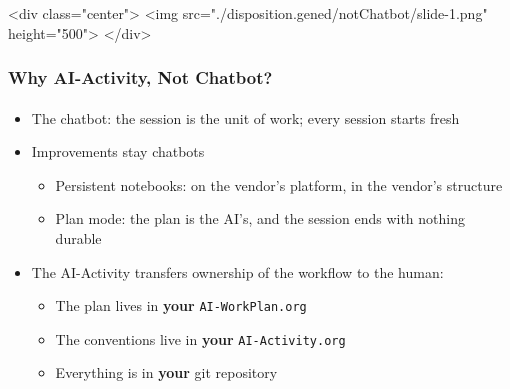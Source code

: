 \begin{whenOrg}
\begin{htmlonly}

\begin{frame}[fragile,plain,label=notChatbot]
    \frametitle{}
    \framesubtitle{}
    \begin{rawhtml}
<div class="center">
<img src="./disposition.gened/notChatbot/slide-1.png" height="500">
</div>
    \end{rawhtml}
\end{frame}
\end{htmlonly}

\begin{verblatex}

\begin{frame}[fragile,plain,label=notChatbot]
    \frametitle{Why AI-Activity, Not Chatbot?}
    \framesubtitle{}

\begin{itemize}
  \item The chatbot: the session is the unit of work; every session starts fresh
  \item Improvements stay chatbots
    \begin{itemize}
    \item Persistent notebooks: on the vendor's platform, in the vendor's structure
    \item Plan mode: the plan is the AI's, and the session ends with nothing durable
    \end{itemize}
  \item The AI-Activity transfers ownership of the workflow to the human:
    \begin{itemize}
    \item The plan lives in \textbf{your} \texttt{AI-WorkPlan.org}
    \item The conventions live in \textbf{your} \texttt{AI-Activity.org}
    \item Everything is in \textbf{your} git repository
    \end{itemize}
  \end{itemize}

\end{frame}
\end{verblatex}
\end{whenOrg}
